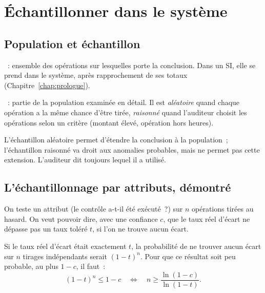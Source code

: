 \separateur

\section{Échantillonner dans le système}
\label{sec:c07-echantillon}

\subsection{Population et échantillon}

\begin{boxdef}
~: ensemble des opérations sur
lesquelles porte la conclusion. Dans un SI, elle se prend dans le système,
après rapprochement de ses totaux (Chapitre~\ref{chap:prologue}).

\medskip
{}~: partie de la population
examinée en détail. Il est \emph{aléatoire} quand chaque opération a la même
chance d'être tirée, \emph{raisonné} quand l'auditeur choisit les opérations
selon un critère (montant élevé, opération hors heures).
\end{boxdef}

L'échantillon aléatoire permet d'étendre la conclusion à la population~;
l'échantillon raisonné va droit aux anomalies probables, mais ne permet pas
cette extension. L'auditeur dit toujours lequel il a utilisé.

\subsection{L'échantillonnage par attributs, démontré}

On teste un attribut (le contrôle a-t-il été exécuté~?) sur $n$ opérations
tirées au hasard. On veut pouvoir dire, avec une confiance $c$, que le taux
réel d'écart ne dépasse pas un taux toléré $t$, si l'on ne trouve aucun
écart.

Si le taux réel d'écart était exactement $t$, la probabilité de ne trouver
aucun écart sur $n$ tirages indépendants serait $(1 - t)^n$. Pour que ce
résultat soit peu probable, au plus $1 - c$, il faut~:
\[
    (1 - t)^n \leq 1 - c
    \quad\Longleftrightarrow\quad
    n \geq \frac{\ln(1 - c)}{\ln(1 - t)}.
\]

